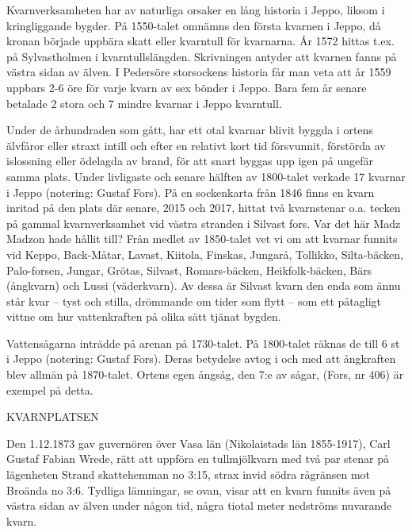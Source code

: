 Kvarnverksamheten har av naturliga orsaker en lång historia i Jeppo, liksom i kringliggande bygder. På 1550-talet omnämns den första kvarnen i Jeppo, då kronan började uppbära skatt eller kvarntull för kvarnarna. År 1572 hittas t.ex.  på Sylvastholmen i kvarntullslängden. Skrivningen antyder att kvarnen fanns på västra sidan av älven. I Pedersöre storsockens historia får man veta att år 1559 uppbars 2-6 öre för varje kvarn av sex bönder i Jeppo. Bara fem år senare betalade 2 stora och 7 mindre kvarnar i Jeppo kvarntull.

Under de århundraden som gått, har ett otal kvarnar blivit byggda i ortens älvfåror eller straxt intill och efter en relativt kort tid försvunnit, förstörda av islossning eller ödelagda av brand, för att snart byggas upp igen på ungefär samma plats. Under livligaste och senare hälften av 1800-talet verkade 17 kvarnar i Jeppo (notering: Gustaf Fors). På en sockenkarta från 1846 finns en kvarn inritad på den plats där  senare, 2015 och 2017, hittat två kvarnstenar o.a. tecken på gammal kvarnverksamhet vid västra stranden i Silvast fors. Var det här Madz Madzon hade hållit till? Från medlet av 1850-talet vet vi om att kvarnar funnits vid Keppo, Back-Måtar, Lavast, Kiitola, Finskas, Jungarå, Tollikko, Silta-bäcken, Palo-forsen, Jungar, Grötas, Silvast, Romars-bäcken, Heikfolk-bäcken, Bärs (ångkvarn) och Lussi (väderkvarn). Av dessa är Silvast kvarn den enda som ännu står kvar -- tyst och stilla, drömmande om tider som flytt -- som ett påtagligt vittne om hur vattenkraften på olika sätt tjänat bygden.

Vattensågarna inträdde på arenan på 1730-talet. På 1800-talet räknas de till 6 st i Jeppo (notering: Gustaf Fors). Deras betydelse avtog i och med att ångkraften blev allmän på 1870-talet. Ortens egen ångsåg, den 7:e av sågar, (Fors, nr 406) är exempel på detta.


KVARNPLATSEN

Den 1.12.1873 gav guvernören över Vasa län (Nikolaistads län 1855-1917), Carl Gustaf Fabian Wrede, rätt att uppföra en tullmjölkvarn med två par stenar på lägenheten Strand skattehemman no 3:15, strax invid södra rågränsen mot Broända no 3:6. Tydliga lämningar, se ovan, visar att en kvarn funnits även på västra sidan av älven under någon tid, några tiotal meter nedströms nuvarande kvarn.

